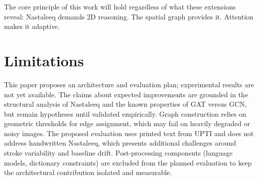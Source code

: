 \documentclass[11pt]{article}
\begin{document}
The core principle of this work will hold regardless of what these extensions reveal:
Nastaleeq demands 2D reasoning.
The spatial graph provides it.
Attention makes it adaptive.

\section*{Limitations}

This paper proposes an architecture and evaluation plan; experimental results are not
yet available.
The claims about expected improvements are grounded in the structural analysis of
Nastaleeq and the known properties of GAT versus GCN, but remain hypotheses until
validated empirically.
Graph construction relies on geometric thresholds for edge assignment, which may fail
on heavily degraded or noisy images.
The proposed evaluation uses printed text from UPTI and does not address handwritten
Nastaleeq, which presents additional challenges around stroke variability and baseline
drift.
Post-processing components (language models, dictionary constraints) are excluded from
the planned evaluation to keep the architectural contribution isolated and measurable.


\end{document}
